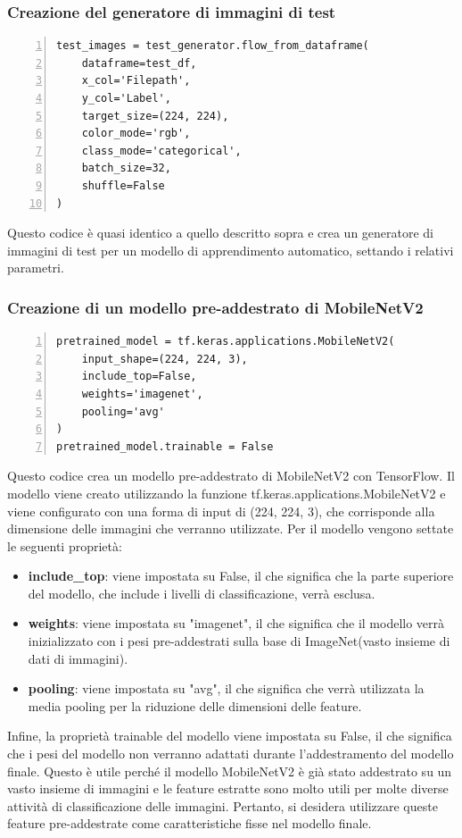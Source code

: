\documentclass[a4paper,final,12pt]{report}
\begin{document}
\newpage
\subsubsection{Creazione del generatore di immagini di test}
\begin{lstlisting}[caption={Creazione del generatore di immagini di test.}, label={lst:Generatore_di_immagini_di_test}, breaklines, escapechar=`\%, frame=lines, basicstyle=\small\ttfamily, keepspaces=true, numbers=left]
test_images = test_generator.flow_from_dataframe(
    dataframe=test_df,
    x_col='Filepath',
    y_col='Label',
    target_size=(224, 224),
    color_mode='rgb',
    class_mode='categorical',
    batch_size=32,
    shuffle=False
)
\end{lstlisting}
Questo codice è quasi identico a quello descritto sopra e crea un generatore di immagini di test per un modello di apprendimento automatico, settando i relativi parametri. 

\subsubsection{Creazione di un modello pre-addestrato di MobileNetV2}
\begin{lstlisting}[caption={Modello pre-addestrato di MobileNetV2t.}, label={lst:modello_MobileNetV2}, breaklines, escapechar=`\%, frame=lines, basicstyle=\small\ttfamily, keepspaces=true, numbers=left]
pretrained_model = tf.keras.applications.MobileNetV2(
    input_shape=(224, 224, 3),
    include_top=False,
    weights='imagenet',
    pooling='avg'
)
pretrained_model.trainable = False
\end{lstlisting}
Questo codice crea un modello pre-addestrato di MobileNetV2 con TensorFlow. Il modello viene creato utilizzando la funzione tf.keras.applications.MobileNetV2 e viene configurato con una forma di input di (224, 224, 3), che corrisponde alla dimensione delle immagini che verranno utilizzate. Per il modello vengono settate le seguenti proprietà:
\begin{itemize}
    \item \textbf{include\_top}: viene impostata su False, il che significa che la parte superiore del modello, che include i livelli di classificazione, verrà esclusa.
    \item  \textbf{weights}: viene impostata su "imagenet", il che significa che il modello verrà inizializzato con i pesi pre-addestrati sulla base di ImageNet(vasto insieme di dati di immagini).
    \item  \textbf{pooling}: viene impostata su "avg", il che significa che verrà utilizzata la media pooling per la riduzione delle dimensioni delle feature.
\end{itemize}
Infine, la proprietà trainable del modello viene impostata su False, il che significa che i pesi del modello non verranno adattati durante l'addestramento del modello finale. Questo è utile perché il modello MobileNetV2 è già stato addestrato su un vasto insieme di immagini e le feature estratte sono molto utili per molte diverse attività di classificazione delle immagini. Pertanto, si desidera utilizzare queste feature pre-addestrate come caratteristiche fisse nel modello finale.\\
\newpage
\end{document}
